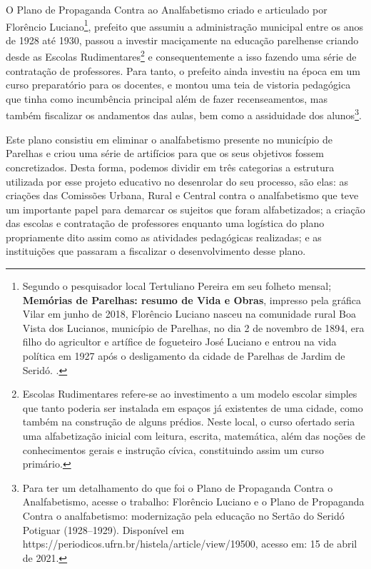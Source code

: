 \begin{refsection}
O Plano de Propaganda Contra ao Analfabetismo criado e articulado por Florêncio Luciano\footnote{Segundo o pesquisador local Tertuliano Pereira em seu folheto mensal; \textbf{Memórias de Parelhas: resumo de Vida e Obras}, impresso pela gráfica Vilar em junho de 2018, Florêncio Luciano nasceu na comunidade rural Boa Vista dos Lucianos, município de Parelhas, no dia 2 de novembro de 1894, era filho do agricultor e artífice de fogueteiro José Luciano e entrou na vida política em 1927 após o desligamento da cidade de Parelhas de Jardim de Seridó. \cite[p.~2]{Pereira2018Memorias}.}, prefeito que assumiu a administração municipal entre os anos de 1928 até 1930, passou a investir maciçamente na educação parelhense criando desde as Escolas Rudimentares\footnote{Escolas Rudimentares refere-se ao investimento a um modelo escolar simples que tanto poderia ser instalada em espaços já existentes de uma cidade, como também na construção de alguns prédios. Neste local, o curso ofertado seria uma alfabetização inicial com leitura, escrita, matemática, além das noções de conhecimentos gerais e instrução cívica, constituindo assim um curso primário.} e consequentemente a isso fazendo uma série de contratação de professores. Para tanto, o prefeito ainda investiu na época em um curso preparatório para os docentes, e montou uma teia de vistoria pedagógica que tinha como incumbência principal além de fazer recenseamentos, mas também fiscalizar os andamentos das aulas, bem como a assiduidade dos alunos\footnote{Para ter um detalhamento do que foi o Plano de Propaganda Contra o Analfabetismo, acesse o trabalho: Florêncio Luciano e o Plano de Propaganda Contra o analfabetismo: modernização pela educação no Sertão do Seridó Potiguar (1928--1929). Disponível em https://periodicos.ufrn.br/histela/article/view/19500, acesso em: 15 de abril de 2021.}.

Este plano consistiu em eliminar o analfabetismo presente no município de Parelhas e criou uma série de artifícios para que os seus objetivos fossem concretizados. Desta forma, podemos dividir em três categorias a estrutura utilizada por esse projeto educativo no desenrolar do seu processo, são elas: as criações das Comissões Urbana, Rural e Central contra o analfabetismo que teve um importante papel para demarcar os sujeitos que foram alfabetizados; a criação das escolas e contratação de professores enquanto uma logística do plano propriamente dito assim como as atividades pedagógicas realizadas; e as instituições que passaram a fiscalizar o desenvolvimento desse plano. 


\end{refsection}

